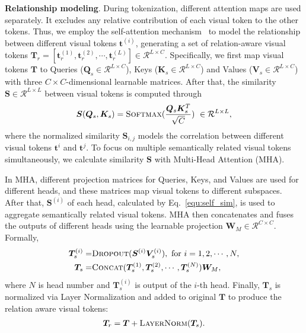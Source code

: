 \documentclass[letterpaper]{article} \usepackage{aaai22}  \usepackage{times}  \usepackage{helvet}  \usepackage{courier}  \usepackage[hyphens]{url}  \usepackage{graphicx} \urlstyle{rm} \def\UrlFont{\rm}  \usepackage{natbib}  \usepackage{caption} \DeclareCaptionStyle{ruled}{labelfont=normalfont,labelsep=colon,strut=off} \frenchspacing  \setlength{\pdfpagewidth}{8.5in}  \setlength{\pdfpageheight}{11in}  \usepackage{algorithm}
\newcommand{\Th}[1]{\textsc{#1}}
\begin{document}
\noindent \textbf{Relationship modeling}. 
During tokenization, different attention maps are used separately. It excludes any relative contribution of each visual token to the other tokens.
Thus, we employ the self-attention mechanism~\cite{tr} to model the relationship between different visual tokens $\bm{t}^{(i)}$, generating a set of relation-aware visual tokens $\bm{T}_{r}=\left[ \bm{t}_r^{(1)},\bm{t}_r^{(2)},\cdots,\bm{t}_r^{(L)}\right] \in \mathcal{R}^{L \times C}$.
Specifically, we first map visual tokens $\bm{T}$ to Queries ($\bm{Q}_{s} \in \mathcal{R}^{L \times C}$), 
Keys ($\bm{K}_{s} \in \mathcal{R}^{L \times C}$) and Values ($\bm{V}_{s} \in \mathcal{R}^{L \times C}$) with three $C \times C$-dimensional learnable matrices.
After that, the similarity $\bm{S} \in \mathcal{R}^{L \times L}$ between visual tokens is computed through
\begin{eqnarray}\label{equ:self_sim}
	\bm{S}(\bm{Q}_s,\bm{K}_s)=\text{\Th{Softmax}}(\frac{\bm{Q}_{s} \bm{K}_{s}^{T}}{\sqrt{C}})\ \in \mathcal{R}^{L \times L},
\end{eqnarray}
where the normalized similarity $\bm{S}_{i,j}$ models the correlation between different visual tokens $\bm{t}^{{i}}$ and $\bm{t}^{{j}}$.
To focus on multiple semantically related visual tokens simultaneously, we calculate similarity $\bm{S}$ with Multi-Head Attention (MHA). 

In MHA, different projection matrices for Queries, Keys, and Values are used for different heads, and these matrices map visual tokens to different subspaces. 
After that, $\bm{S}^{(i)}$ of each head, calculated by Eq.~\eqref{equ:self_sim}, is used to aggregate semantically related visual tokens. MHA then concatenates and fuses the outputs of different heads using the learnable projection $\bm{W}_M \in \mathcal{R}^{C \times C}$.
Formally,
\begin{eqnarray}\label{equ:MHA}
	\begin{aligned}
		\bm{T}_{s}^{(i)} =& \text{\Th{Dropout}}(\bm{S}^{(i)}\bm{V}_{s}^{(i)}),\ \mbox{for}\ i=1,2,\cdots,N, \\
		\bm{T}_{s} =& \text{\Th{Concat}}(\bm{T}_{s}^{(1)},\bm{T}_{s}^{(2)},\cdots,\bm{T}_{s}^{(N)})\bm{W}_M,
	\end{aligned}
\end{eqnarray}
where $N$ is head number and $\bm{T}_{s}^{(i)}$ is output of the $i$-th head.
Finally, $\bm{T}_{s}$ is normalized via Layer Normalization and added to original $\bm{T}$ to produce the relation aware visual tokens:
\begin{eqnarray}
	\label{equ:residue_connect_self}
	\bm{T}_r=\bm{T}+\text{\Th{LayerNorm}}(\bm{T}_{s}).
\end{eqnarray}
\end{document}
